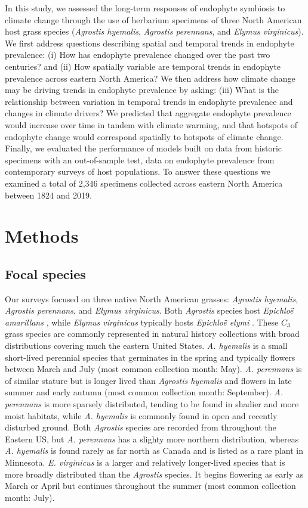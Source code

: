 \documentclass[11pt]{article}
\let\cite\citep
\begin{document}
In this study, we assessed the long-term responses of endophyte symbiosis to climate change through the use of herbarium specimens of three North American host grass species (\emph{Agrostis hyemalis}, \emph{Agrostis perennans}, and \emph{Elymus virginicus}).
We first address questions describing spatial and temporal trends in endophyte prevalence: (i) How has endophyte prevalence changed over the past two centuries? and (ii) How spatially variable are temporal trends in endophyte prevalence across eastern North America?
We then address how climate change may be driving trends in endophyte prevalence by asking: (iii) What is the relationship between variation in temporal trends in endophyte prevalence and changes in climate drivers?
We predicted that aggregate endophyte prevalence would increase over time in tandem with climate warming, and that hotspots of endophyte change would correspond spatially to hotspots of climate change. 
Finally, we evaluated the performance of models built on data from historic specimens with an out-of-sample test, data on endophyte prevalence from contemporary surveys of host populations. 
To answer these questions we examined a total of 2,346 specimens collected across eastern North America between 1824 and 2019.
	
\section*{Methods}
        \subsection*{Focal species}
Our surveys focused on three native North American grasses: \emph{Agrostis hyemalis}, \emph{Agrostis perennans}, and \emph{Elymus virginicus}. 
Both \emph{Agrostis} species host \emph{Epichloë amarillans} \cite{craven2001multigene, leuchtmann2014nomenclatural}, while \emph{Elymus virginicus} typically hosts \emph{Epichloë elymi} \cite{clay2002evolutionary}.
These $C_3$ grass species are commonly represented in natural history collections with broad distributions covering much the eastern United States.
\emph{A. hyemalis} is a small short-lived perennial species that germinates in the spring and typically flowers between March and July (most common collection month: May).
\emph{A. perennans} is of similar stature but is longer lived than \emph{Agrostis hyemalis} and flowers in late summer and early autumn (most common collection month: September). 
\emph{A. perennans} is more sparsely distributed, tending to be found in shadier and more moist habitats, while \emph{A. hyemalis} is commonly found in open and recently disturbed ground. 
Both \emph{Agrostis} species are recorded from throughout the Eastern US, but \emph{A. perennans} has a slighty more northern distribution, whereas \emph{A. hyemalis} is found rarely as far north as Canada and is listed as a rare plant in Minnesota.
\emph{E. virginicus} is a larger and relatively longer-lived  species that is more broadly distributed than the \emph{Agrostis} species. 
It begins flowering as early as March or April but continues throughout the summer (most common collection month: July).
\end{document}
